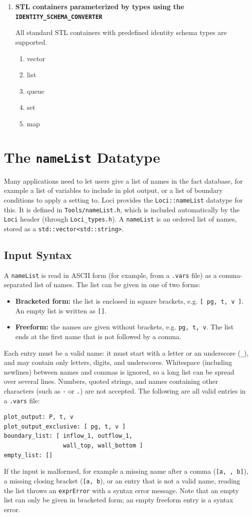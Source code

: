 \begin{enumerate}
\begin{verbatim}
 template<T>
 struct vector2d {
      T x,y ;
 }
\end{verbatim}
\item {\bf STL containers parameterized by types using the {\tt
      IDENTITY\_SCHEMA\_CONVERTER}} 

All standard STL containers with predefined identity schema types are supported.
\begin{enumerate}
\item vector
\item list
\item queue
\item set
\item map
\end{enumerate}
\end{enumerate}
%
\section {The {\tt nameList} Datatype}
%
Many applications need to let users give a list of names in the fact
database, for example a list of variables to include in plot
output, or a list of boundary conditions to apply a setting to.  Loci
provides the {\tt Loci::nameList} datatype for this.  It is defined in
{\tt Tools/nameList.h}, which is included automatically by the
{\tt Loci} header (through {\tt Loci\_types.h}).  A {\tt nameList} is an ordered
list of names, stored as a {\tt std::vector<std::string>}.
%
\subsection {Input Syntax}
%
A {\tt nameList} is read in ASCII form (for example, from a {\tt .vars}
file) as a comma-separated list of names.  The list can be given in
one of two forms:
\begin{itemize}
\item {\bf Bracketed form:} the list is enclosed in square brackets,
  e.g. {\tt [ pg, t, v ]}.  An empty list is written as {\tt []}.
\item {\bf Freeform:} the names are given without brackets,
  e.g. {\tt pg, t, v}.  The list ends at the first name that is not
  followed by a comma.
\end{itemize}
Each entry must be a valid name: it must start with a letter or an
underscore ({\tt \_}), and may contain only letters, digits, and
underscores.  Whitespace (including newlines) between names and
commas is ignored, so a long list can be spread over several lines.
Numbers, quoted strings, and names containing other characters (such
as {\tt -} or {\tt .}) are not accepted.  The following are all valid
entries in a {\tt .vars} file:
\begin{verbatim}
plot_output: P, t, v
plot_output_exclusive: [ pg, t, v ]
boundary_list: [ inflow_1, outflow_1,
                 wall_top, wall_bottom ]
empty_list: []
\end{verbatim}
%
If the input is malformed, for example a missing name after a comma
({\tt [a, , b]}), a missing closing bracket ({\tt [a, b}), or an entry
that is not a valid name, reading the list throws an {\tt exprError}
with a syntax error message.  Note that an empty list can only be
given in bracketed form; an empty freeform entry is a syntax error.
%
